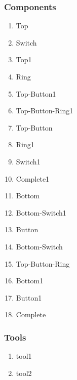 \documentclass[10pt,a4paper]{report}
\begin{document}
\subsubsection*{Components}
\begin{enumerate}
\item Top
\item Switch
\item Top1
\item Ring
\item Top-Button1
\item Top-Button-Ring1
\item Top-Button
\item Ring1
\item Switch1
\item Complete1
\item Bottom
\item Bottom-Switch1
\item Button
\item Bottom-Switch
\item Top-Button-Ring
\item Bottom1
\item Button1
\item Complete
\end{enumerate}

\subsubsection*{Tools}
\begin{enumerate}
\item tool1
\item tool2
\end{enumerate}

\newcommand*\rot{\rotatebox{90}}
\end{document}
